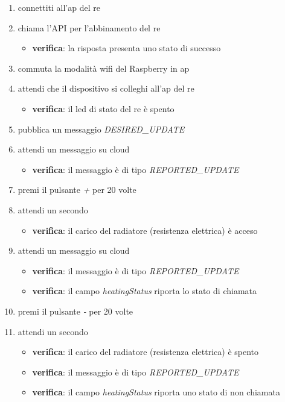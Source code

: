 \documentclass[12pt,a4paper,twoside,titlepage]{book}
\begin{document}
\begin{enumerate}
    \item connettiti all'\acrshort{ap} del \acrshort{re}
    \item chiama l'API per l'abbinamento del \acrshort{re} 
    \begin{itemize}
        \item \textbf{verifica}: la risposta presenta uno stato di successo 
    \end{itemize}
    \item commuta la modalità \Gls{wifi} del Raspberry in \acrshort{ap}
    \item attendi che il dispositivo si colleghi all'\acrshort{ap} del \acrshort{re}
    \begin{itemize}
        \item \textbf{verifica}: il  \acrshort{led} di stato del \acrshort{re} è spento 
    \end{itemize}
    \item pubblica un messaggio \textit{DESIRED\_UPDATE}
    \item attendi un messaggio su cloud 
    \begin{itemize}
        \item \textbf{verifica}: il messaggio è di tipo \textit{REPORTED\_UPDATE}
    \end{itemize}
    \item premi il pulsante \textit{+} per 20 volte
    \item attendi un secondo
    \begin{itemize}
        \item \textbf{verifica}: il carico del radiatore (resistenza elettrica) è acceso 
    \end{itemize}
    \item attendi un messaggio su cloud 
    \begin{itemize}
        \item \textbf{verifica}: il messaggio è di tipo \textit{REPORTED\_UPDATE}
        \item \textbf{verifica}: il campo \textit{heatingStatus} riporta lo stato di chiamata 
    \end{itemize}
    \item premi il pulsante \textit{-} per 20 volte 
    \item attendi un secondo 
    \begin{itemize}
        \item \textbf{verifica}: il carico del radiatore (resistenza elettrica) è spento 
    \end{itemize}
    \begin{itemize}
        \item \textbf{verifica}: il messaggio è di tipo \textit{REPORTED\_UPDATE}
        \item \textbf{verifica}: il campo \textit{heatingStatus} riporta uno stato di non chiamata 
    \end{itemize}
\end{enumerate}
\end{document}
